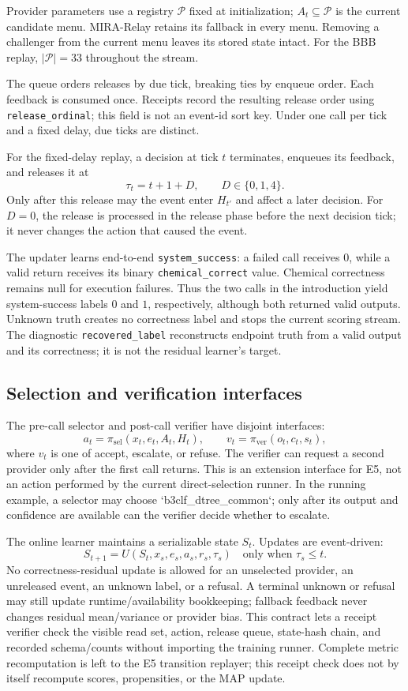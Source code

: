 \documentclass[sigconf,anonymous]{aamas}
\begin{document}
Provider parameters use a registry $\mathcal P$ fixed at initialization; $A_t\subseteq\mathcal P$ is the current candidate menu. MIRA-Relay retains its fallback in every menu. Removing a challenger from the current menu leaves its stored state intact. For the BBB replay, $|\mathcal P|=33$ throughout the stream.

The queue orders releases by due tick, breaking ties by enqueue order. Each feedback is consumed once. Receipts record the resulting release order using \texttt{release\_ordinal}; this field is not an event-id sort key. Under one call per tick and a fixed delay, due ticks are distinct.

For the fixed-delay replay, a decision at tick $t$ terminates, enqueues its feedback, and releases it at
$$
\tau_t=t+1+D,\qquad D\in\{0,1,4\}.
$$
Only after this release may the event enter $H_{t'}$ and affect a later decision.
For $D=0$, the release is processed in the release phase before the next decision tick; it never changes the action that caused the event.

The updater learns end-to-end \texttt{system\_success}: a failed call receives $0$, while a valid return receives its binary \texttt{chemical\_correct} value. Chemical correctness remains null for execution failures. Thus the two calls in the introduction yield system-success labels $0$ and $1$, respectively, although both returned valid outputs. Unknown truth creates no correctness label and stops the current scoring stream. The diagnostic \texttt{recovered\_label} reconstructs endpoint truth from a valid output and its correctness; it is not the residual learner's target.

\subsection{Selection and verification interfaces}
The pre-call selector and post-call verifier have disjoint interfaces:
$$
a_t=\pi_{\mathrm{sel}}(x_t,e_t,A_t,H_t),\qquad v_t=\pi_{\mathrm{ver}}(o_t,c_t,s_t),
$$
where $v_t$ is one of accept, escalate, or refuse. The verifier can request a second provider only after the first call returns. This is an extension interface for E5, not an action performed by the current direct-selection runner. In the running example, a selector may choose `b3clf\_dtree\_common`; only after its output and confidence are available can the verifier decide whether to escalate.

The online learner maintains a serializable state $S_t$. Updates are event-driven:
$$
S_{t+1}=U(S_t,x_s,e_s,a_s,r_s,\tau_s)\quad\text{only when }\tau_s\leq t.
$$
No correctness-residual update is allowed for an unselected provider, an unreleased event, an unknown label, or a refusal. A terminal unknown or refusal may still update runtime/availability bookkeeping; fallback feedback never changes residual mean/variance or provider bias. This contract lets a receipt verifier check the visible read set, action, release queue, state-hash chain, and recorded schema/counts without importing the training runner. Complete metric recomputation is left to the E5 transition replayer; this receipt check does not by itself recompute scores, propensities, or the MAP update.
\end{document}
